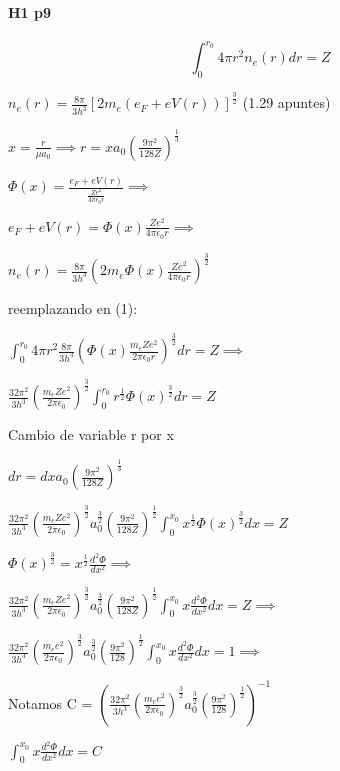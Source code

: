 \documentclass[12pt]{book}
\begin{document}
\paragraph{H1 p9}
\begin{equation}
\int_0^{r_0}{4\pi r^2 n_e(r) dr } = Z
\end{equation}


$n_e(r) = \frac{8 \pi}{3 h^3} [2 m_e (e_F + e V(r))]^{\frac{3}{2}}$  (1.29 apuntes)

$x = \frac{r}{\mu a_0} \implies r = x a_0 (\frac{9 \pi^2}{128 Z})^{\frac{1}{3}}$

$\Phi(x) = \frac{e_F + e V(r)}{\frac{Z e^2}{4 \pi \epsilon_0 r}} \implies $

$e_F + e V(r) = \Phi(x) \frac{Z e^2}{4 \pi \epsilon_0 r} \implies $

$n_e(r) = \frac{8 \pi}{3 h^3} (2 m_e \Phi(x) \frac{Z e^2}{4 \pi \epsilon_0 r} )^{\frac{3}{2}}$ 

reemplazando en (1):

$\int_0^{r_0}{4\pi r^2  \frac{8 \pi}{3 h^3} (\Phi(x) \frac{m_e Z e^2}{2 \pi \epsilon_0 r} )^{\frac{3}{2}}dr } = Z \implies$

$\frac{32 \pi^2}{3 h^3} (\frac{m_e Z e^2}{2 \pi \epsilon_0})^{\frac{3}{2}} \int_0^{r_0}{r^{\frac{1}{2}} \Phi(x)^{\frac{3}{2}} dr } = Z$

Cambio de variable r por x 

$dr = dx a_0 (\frac{9 \pi^2}{128 Z})^{\frac{1}{3}}$


$\frac{32 \pi^2}{3 h^3} (\frac{m_e Z e^2}{2 \pi \epsilon_0})^{\frac{3}{2}} a_0^{\frac{3}{2}}  (\frac{9 \pi^2}{128 Z})^{\frac{1}{2}}\int_0^{x_0}{x^{\frac{1}{2}} \Phi(x)^{\frac{3}{2}} dx } = Z $

$\Phi(x)^{\frac{3}{2}} = x^{\frac{1}{2}} \frac{d^2\Phi}{dx^2} \implies$

$\frac{32 \pi^2}{3 h^3} (\frac{m_e Z e^2}{2 \pi \epsilon_0})^{\frac{3}{2}} a_0^{\frac{3}{2}}  (\frac{9 \pi^2}{128 Z})^{\frac{1}{2}}\int_0^{x_0}{x \frac{d^2\Phi}{dx^2} dx } = Z \implies$


$\frac{32 \pi^2}{3 h^3} (\frac{m_e  e^2}{2 \pi \epsilon_0})^{\frac{3}{2}} a_0^{\frac{3}{2}}  (\frac{9 \pi^2}{128 })^{\frac{1}{2}}\int_0^{x_0}{x \frac{d^2\Phi}{dx^2} dx } = 1 \implies$

Notamos C = $(\frac{32 \pi^2}{3 h^3} (\frac{m_e  e^2}{2 \pi \epsilon_0})^{\frac{3}{2}} a_0^{\frac{3}{2}}  (\frac{9 \pi^2}{128 })^{\frac{1}{2}})^{-1} $

$\int_0^{x_0}{x \frac{d^2\Phi}{dx^2} dx } = C $
\end{document}
